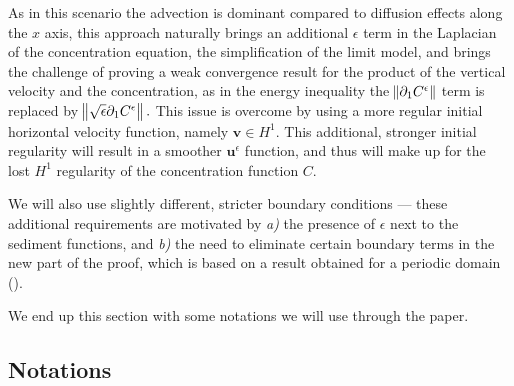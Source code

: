 \documentclass[11pt]{article}
\begin{document}

As in this scenario the advection is dominant compared to diffusion effects along the $x$ axis, this approach naturally brings an additional $\epsilon$ term in the Laplacian of the concentration equation, the simplification of the limit model, and brings the challenge of proving a weak convergence result for the product of the vertical velocity and the concentration, as in the energy inequality the $\norm{\partial_1 C^\epsilon}$ term is replaced by $\norm{\sqrt{\epsilon} \partial_1 C^\epsilon}.$ This issue is overcome by using a more regular initial horizontal velocity function, namely $\mathbf{v} \in H^1.$ This additional, stronger initial regularity will result in a smoother $\mathbf{u}^\epsilon$ function, and thus will make up for the lost $H^1$ regularity of the concentration function $C.$

We will also use slightly different, stricter boundary conditions --- these additional requirements are motivated by \textit{a)} the presence of $\epsilon$ next to the sediment functions, and \textit{b)} the need to eliminate certain boundary terms in the new part of the proof, which is based on a result obtained for a periodic domain (\cite{li2019primitive}).

We end up this section with some notations we will use through the paper.

\subsection{Notations}
\end{document}
